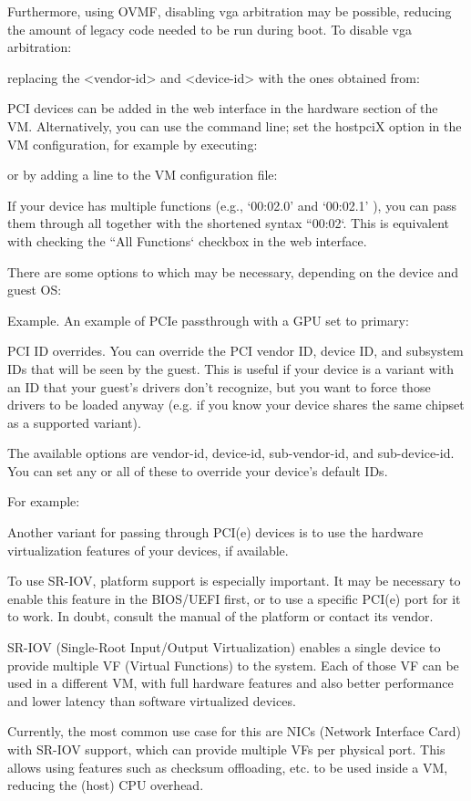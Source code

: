 Furthermore, using OVMF, disabling vga arbitration may be possible, reducing the amount of legacy code needed to be run during boot. To disable vga arbitration:

replacing the <vendor-id> and <device-id> with the ones obtained from:

PCI devices can be added in the web interface in the hardware section of the VM. Alternatively, you can use the command line; set the hostpciX option in the VM configuration, for example by executing:

or by adding a line to the VM configuration file:

If your device has multiple functions (e.g., ‘00:02.0’ and ‘00:02.1’ ), you can pass them through all together with the shortened syntax ``00:02`. This is equivalent with checking the ``All Functions` checkbox in the web interface.

There are some options to which may be necessary, depending on the device and guest OS:

Example. An example of PCIe passthrough with a GPU set to primary:

PCI ID overrides. You can override the PCI vendor ID, device ID, and subsystem IDs that will be seen by the guest. This is useful if your device is a variant with an ID that your guest’s drivers don’t recognize, but you want to force those drivers to be loaded anyway (e.g. if you know your device shares the same chipset as a supported variant).

The available options are vendor-id, device-id, sub-vendor-id, and sub-device-id. You can set any or all of these to override your device’s default IDs.

For example:

Another variant for passing through PCI(e) devices is to use the hardware virtualization features of your devices, if available.

To use SR-IOV, platform support is especially important. It may be necessary to enable this feature in the BIOS/UEFI first, or to use a specific PCI(e) port for it to work. In doubt, consult the manual of the platform or contact its vendor.

SR-IOV (Single-Root Input/Output Virtualization) enables a single device to provide multiple VF (Virtual Functions) to the system. Each of those VF can be used in a different VM, with full hardware features and also better performance and lower latency than software virtualized devices.

Currently, the most common use case for this are NICs (Network Interface Card) with SR-IOV support, which can provide multiple VFs per physical port. This allows using features such as checksum offloading, etc. to be used inside a VM, reducing the (host) CPU overhead.

